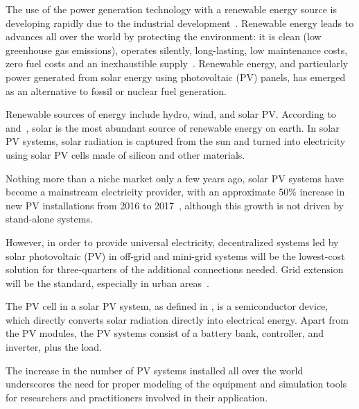 The use of the power generation technology with a renewable energy source is developing rapidly due to the industrial development~\cite{Yatimi}. Renewable energy leads to advances all over the world by protecting the environment: it is clean (low greenhouse gas emissions), operates silently, long-lasting, low maintenance costs, zero fuel costs and an  inexhaustible supply~\cite{Noroozian}. Renewable energy, and particularly power generated from solar energy using photovoltaic (PV) panels, has emerged as an alternative to fossil or nuclear fuel generation. 

Renewable sources of energy include hydro, wind, and solar PV. According to~\cite{SEIA} and~\cite{Chauhan}, solar is the most abundant source of renewable energy on earth. In solar PV systems, solar radiation is captured from the sun and turned into electricity using solar PV cells made of silicon and other materials.

Nothing more than a niche market only a few years ago, solar PV systems have become a mainstream electricity provider, with an  approximate 50\% increase in new PV installations from 2016 to 2017~\cite{EPIA}, although this growth is not driven by stand-alone systems.

However, in order to provide universal electricity, decentralized systems led by solar photovoltaic (PV) in off-grid and mini-grid systems will be the lowest-cost solution for three-quarters of the additional connections needed. Grid extension will be the standard, especially in urban areas~\cite{IEAweo2018}.

The PV cell in a solar PV system, as defined in \cite{Rawat}, is a semiconductor device, which directly converts solar radiation directly into electrical energy. Apart from the PV modules, the PV systems consist of a battery bank, controller, and inverter, plus the load.
%
%

The increase in the number of PV systems installed all over the world underscores the need for proper modeling of the equipment and simulation tools for researchers and practitioners involved in their application. 

